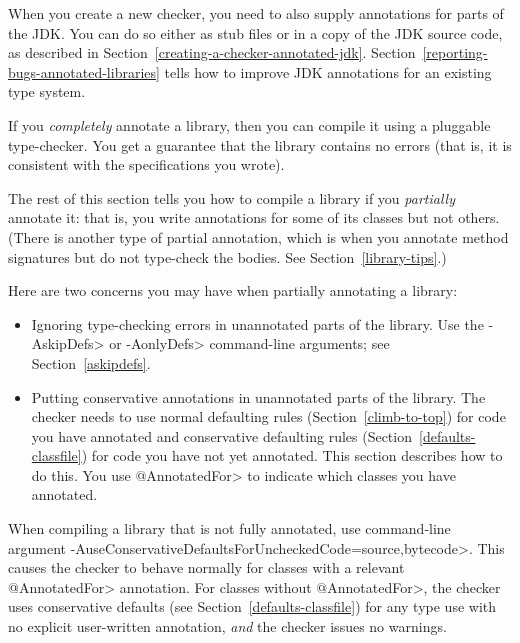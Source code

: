 
When you create a new checker, you need to also supply annotations for
parts of the JDK\@.  You can do so either as stub files or in a copy of the
JDK source code, as described in Section~\ref{creating-a-checker-annotated-jdk}.
Section~\ref{reporting-bugs-annotated-libraries} tells how to improve
JDK annotations for an existing type system.



If you \emph{completely} annotate a library, then you can compile it using a
pluggable type-checker.  You get a guarantee that the library contains no
errors (that is, it is consistent with the specifications you wrote).

The rest of this section tells you how to compile a library if you
\emph{partially} annotate it:  that is, you write annotations for some of its
classes but not others.
(There is another type of partial annotation, which is when you annotate
method signatures but do not type-check the bodies.
See Section~\ref{library-tips}.)

Here are two concerns you may have when partially annotating a library:

\begin{itemize}
\item
  Ignoring type-checking errors in unannotated parts of the library.
  Use the \<-AskipDefs> or \<-AonlyDefs> command-line arguments; see
  Section~\ref{askipdefs}.

\item
  Putting conservative annotations in unannotated parts of the library.
  The checker needs to use normal defaulting rules
  (Section~\ref{climb-to-top}) for code you have annotated and conservative
  defaulting rules (Section~\ref{defaults-classfile}) for code you have not
  yet annotated.  This section describes how to do this.  You use
  \<@AnnotatedFor> to indicate which classes you have annotated.
\end{itemize}




\begin{sloppypar}
When compiling a library that is not fully annotated, use command-line
argument \<-AuseConservativeDefaultsForUncheckedCode=source,bytecode>.  This causes
the checker to behave normally for classes with a relevant \<@AnnotatedFor>
annotation.  For classes without \<@AnnotatedFor>, the checker uses
conservative defaults
(see Section~\ref{defaults-classfile}) for any type use with no explicit
user-written annotation, \emph{and} the checker issues no warnings.
\end{sloppypar}

